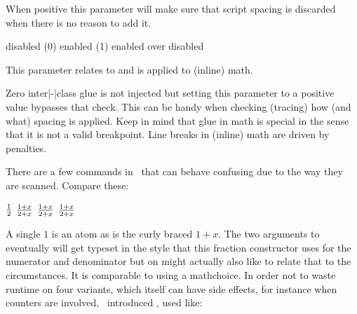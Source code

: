 \stopnewprimitive

\startnewprimitive[title={\prm {mathslackmode}}]

When positive this parameter will make sure that script spacing is discarded when
there is no reason to add it.

\startlinecorrection
{}
    {disabled (0)}
    {
     \space
     }
    {enabled (1)}
    {\startoverlay
       {     }
       { \red{}}
     \stopoverlay
     \space
     \startoverlay
       {     }
       { \red{}}
     \stopoverlay}
   {{\red enabled} over disabled}
\stopcombination
\stoplinecorrection

\stopnewprimitive

\startnewprimitive[title={\prm {mathsnapping}}]

This parameter relates to  and is applied to (inline) math.

\stopnewprimitive

\startnewprimitive[title={\prm {mathspacingmode}}]

Zero inter|-|class glue is not injected but setting this parameter to a positive
value bypasses that check. This can be handy when checking (tracing) how (and
what) spacing is applied. Keep in mind that glue in math is special in the sense
that it is not a valid breakpoint. Line breaks in (inline) math are driven by
penalties.

\stopnewprimitive

\startnewprimitive[title={\prm {mathstack}}]

There are a few commands in \TEX\ that can behave confusing due to the way they
are scanned. Compare these:

\starttyping
$ 1 \over 2 $
$ 1 + x \over 2 + x$
$ {1 + x} \over {2 + x}$
$ {{1 + x} \over {2 + x}}$
\stoptyping

A single $1$ is an atom as is the curly braced ${1 + x}$. The two arguments to
 eventually will get typeset in the style that this fraction
constructor uses for the numerator and denominator but on might actually also
like to relate that to the circumstances. It is comparable to using a \prm
{mathchoice}. In order not to waste runtime on four variants, which itself can have
side effects, for instance when counters are involved, \LUATEX\ introduced
, used like:


